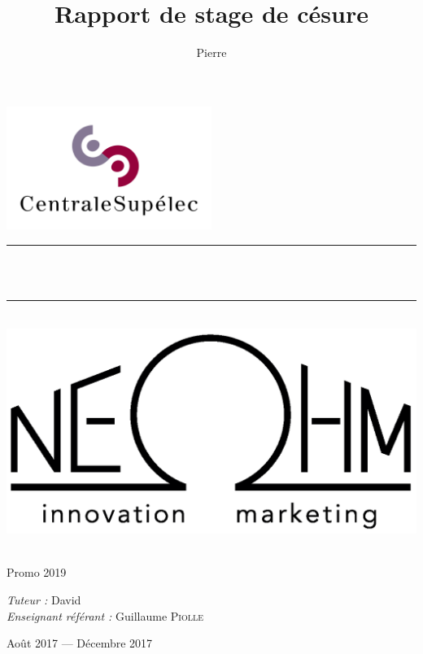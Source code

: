 \documentclass[a4paper, 11pt]{report}
\title{Rapport de stage de césure}
\author{Pierre \bsc{Gintrand}}
\newcommand{\HRule}{\rule{\linewidth}{0.5mm}}
\begin{document}

\makeatletter %
\begin{titlepage}
\begin{center}

\includegraphics[width=0.5\textwidth]{figures/logos/centralesupelec_logo.png}~\\[3cm]

\HRule \\[0.4cm]
{ \huge \bfseries \@title \\[0.4cm] }

\HRule \\[2cm]

\includegraphics[scale=0.3]{figures/logos/neohm_logo.png}\\[3cm]

\begin{minipage}{0.4\textwidth}
  \begin{flushleft} \large
    \@author\\
    Promo 2019\\
  \end{flushleft}
\end{minipage}
\begin{minipage}{0.4\textwidth}
  \begin{flushright} \large
    \emph{Tuteur :} David \\
    \emph{Enseignant référant :} Guillaume \textsc{Piolle}
  \end{flushright}
\end{minipage}

\vfill

{\large Août 2017 — Décembre 2017}

\end{center}
\end{titlepage}
\makeatother %
\end{document}
